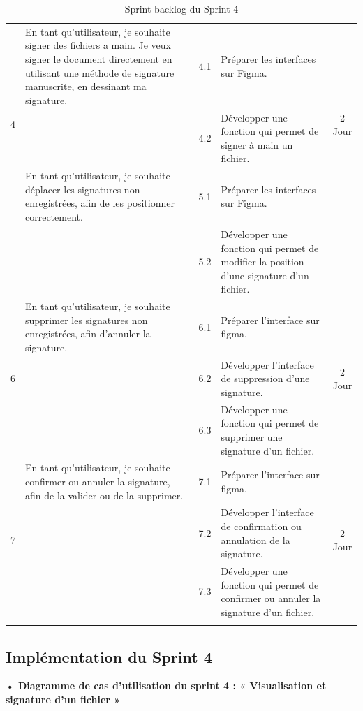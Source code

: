 \begin{adjustwidth}{-1cm}{}
\begin{longtable}{|c|p{6cm}|c|p{6cm}|c|}
      \multirow{3}{*}{4} & En tant qu’utilisateur, je souhaite signer des fichiers a main. Je veux signer le document directement en utilisant une méthode de signature manuscrite, en dessinant ma signature. & 4.1 & Préparer les interfaces sur Figma. & \multirow{3}{*}{2 Jour} \\
      \cline{3-4}
      & & 4.2 & Développer une fonction qui permet de signer à main un fichier. & \\
      \cline{1-5}

      \multirow{3}{*}{5} & En tant qu'utilisateur, je souhaite déplacer les signatures non enregistrées, afin de les positionner correctement.& 5.1 & Préparer les interfaces sur Figma. & \multirow{3}{*}{2 Jour} \\
      \cline{3-4}
      & & 5.2 & Développer une fonction qui permet de modifier la position d'une signature d'un fichier. & \\
      \cline{1-5}

      \multirow{3}{*}{6} & En tant qu'utilisateur, je souhaite supprimer les signatures non enregistrées, afin d'annuler la signature.& 6.1 & Préparer l'interface sur figma. & \multirow{3}{*}{2 Jour} \\
      \cline{3-4}
      & & 6.2 & Développer l'interface de suppression d'une signature. & \\
      & & 6.3 & Développer une fonction qui permet de supprimer une signature d'un fichier. & \\
      \cline{1-5}

      \multirow{3}{*}{7} & En tant qu'utilisateur, je souhaite confirmer ou annuler la signature, afin de la valider ou de la supprimer.& 7.1 & Préparer l'interface sur figma. & \multirow{3}{*}{2 Jour} \\
      \cline{3-4}
      & & 7.2 & Développer l'interface de confirmation ou annulation de la signature. & \\
      & & 7.3 & Développer une fonction qui permet de confirmer ou annuler la signature d'un fichier. & \\
      \cline{1-5}
      
  \hline
  \caption{Sprint backlog du Sprint 4}
  \label{tab:sprint-backlog-3}
\end{longtable}
\end{adjustwidth}

\subsection{Implémentation du Sprint 4}
\textbf{•	Diagramme de cas d'utilisation du sprint 4 : « Visualisation et signature d'un fichier »}

